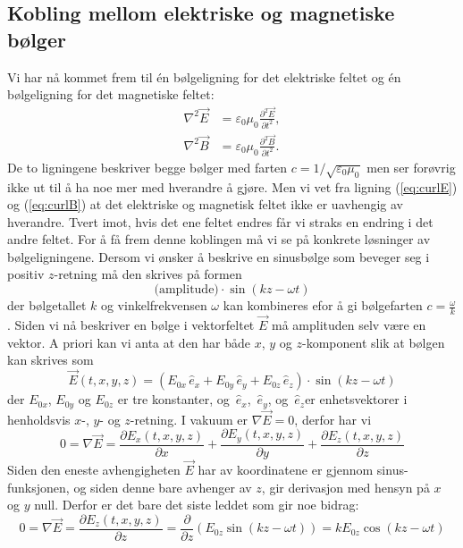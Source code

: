\documentclass[a4paper,norsk,12pt]{article}
\def\ex{\ensuremath{\,{\hat{e}_x}}}
\def\ey{\ensuremath{\,{\hat{e}_y}}}
\def\ez{\ensuremath{\,{\hat{e}_z}}}
\begin{document}
\subsection*{Kobling mellom elektriske og magnetiske bølger}
Vi har nå kommet frem til \'en bølgeligning for det elektriske feltet og \'en bølgeligning for det magnetiske feltet:
\begin{align}
	\nabla^2\vec{E} &= \varepsilon_0\mu_0\frac{\partial^2\vec{E}}{\partial t^2}, \\
	\nabla^2\vec{B} &= \varepsilon_0\mu_0\frac{\partial^2\vec{B}}{\partial t^2}.
\end{align}
De to ligningene beskriver begge bølger med farten $c = 1/\sqrt{\varepsilon_0\mu_0}$ men ser forøvrig ikke ut til å ha noe mer med hverandre å gjøre. Men vi vet fra ligning (\ref{eq:curlE}) og (\ref{eq:curlB}) at det elektriske og magnetisk feltet ikke er uavhengig av hverandre. Tvert imot, hvis det ene feltet endres får vi straks en endring i det andre feltet. For å få frem denne koblingen må vi se på konkrete løsninger av bølgeligningene. Dersom vi ønsker å beskrive en sinusbølge som beveger seg i positiv $z$-retning må den skrives på formen
\begin{displaymath}
	\text{(amplitude)}\cdot\sin(kz-\omega t)
\end{displaymath}
der bølgetallet $k$ og vinkelfrekvensen $\omega$ kan kombineres efor å gi bølgefarten $c=\frac{\omega}{k}$. Siden vi nå beskriver en bølge i vektorfeltet $\vec{E}$ må amplituden selv være en vektor. A priori kan vi anta at den har både $x$, $y$ og $z$-komponent slik at bølgen kan skrives som 
\begin{displaymath}
	\vec{E}(t,x,y,z) = (E_{0x}\ex + E_{0y}\ey + E_{0z}\ez)\cdot\sin(kz-\omega t)
\end{displaymath}
der $E_{0x}$, $E_{0y}$ og $E_{0z}$ er tre konstanter, og \ex, \ey, og \ez er enhetsvektorer i henholdsvis $x$-, $y$- og $z$-retning. I vakuum er $\nabla\vec{E}=0$, derfor har vi
\begin{displaymath}
	0 = \nabla\vec{E} = \frac{\partial E_x(t,x,y,z)}{\partial x} + \frac{\partial E_y(t,x,y,z)}{\partial y} + \frac{\partial E_z(t,x,y,z)}{\partial z}
\end{displaymath}
Siden den eneste avhengigheten $\vec{E}$ har av koordinatene er gjennom sinus-funksjonen, og siden denne bare avhenger av $z$, gir derivasjon med hensyn på $x$ og $y$ null. Derfor er det bare det siste leddet som gir noe bidrag:
\begin{displaymath}
	0 = \nabla\vec{E} = \frac{\partial E_z(t,x,y,z)}{\partial z} = \frac{\partial}{\partial z}\left(E_{0z}\sin(kz-\omega t)\right) = kE_{0z}\cos(kz-\omega t)
\end{displaymath}
\end{document}

